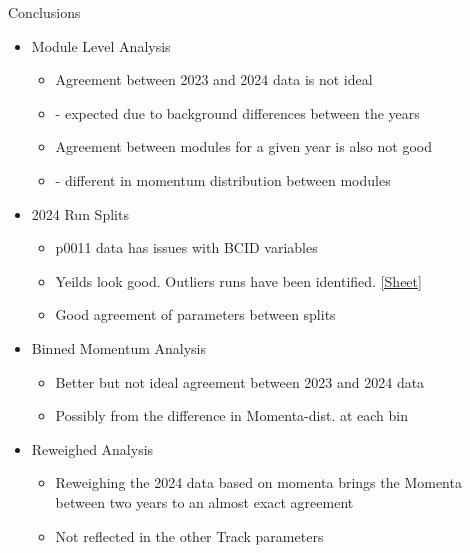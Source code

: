 \begin{frame}{Conclusions}
    \begin{itemize}
        \item Module Level Analysis
        \begin{itemize}
            \item Agreement between 2023 and 2024 data is not ideal 
            \item[] - expected due to background differences between the years
            \item Agreement between modules for a given year is also not good 
            \item[] - different in momentum distribution between modules
        \end{itemize}
        \item 2024 Run Splits
        \begin{itemize}
            \item p0011 data has issues with BCID variables
            \item Yeilds look good. Outliers runs have been identified. \href{https://docs.google.com/spreadsheets/d/1nnYFcmhVieSHI5XAVhPiW1K6CoGYGxv2YPchwL0sqH4/edit?usp=sharing}{[Sheet]}
            \item Good agreement of parameters between splits
        \end{itemize}
        \item Binned Momentum Analysis
        \begin{itemize}
            \item Better but not ideal agreement between 2023 and 2024 data
            \item Possibly from the difference in Momenta-dist. at each bin
        \end{itemize}
        \item Reweighed Analysis
        \begin{itemize}
            \item Reweighing the 2024 data based on momenta brings the Momenta between two years to an almost exact agreement
            \item Not reflected in the other Track parameters
        \end{itemize}
    \end{itemize}
\end{frame}